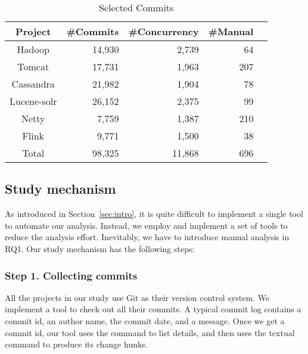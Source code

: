 \begin{table}
	\centering
\begin{SmallOut}
	\caption{Selected Commits}\vspace*{-2ex}
    \label{table:dataset}
	\begin{tabular}{|c|r|r|r|r|}\hline
		Project&\#Commits&\#Concurrency&\#Manual\\\hline
		Hadoop&14,930&2,739&64\\
		Tomcat&17,731&1,963&207\\
		Cassandra&21,982&1,904&78\\
		Lucene-solr&26,152&2,375&99\\
		Netty&7,759&1,387&210\\
		Flink&9,771&1,500&38\\\hline
		Total&98,325&11,868&696\\\hline
	\end{tabular}\vspace*{-3ex}
  \end{SmallOut}
\end{table}

\subsection{Study mechanism}
\label{sec:method:tool}
As introduced in Section~\ref{sec:intro}, it is quite difficult to implement a single tool to automate our analysis. Instead, we employ and implement a set of tools to reduce the analysis effort. Inevitably, we have to introduce manual analysis in RQ1. Our study mechanism has the following steps:

\subsubsection{Step 1. Collecting commits} All the projects in our study use Git as their version control system. We implement a tool to check out all their commits. A typical commit log contains a commit id, an author name, the commit date, and a message. Once we get a commit id, our tool uses the  command to list details, and then uses the textual  command to produce its change hunks.

